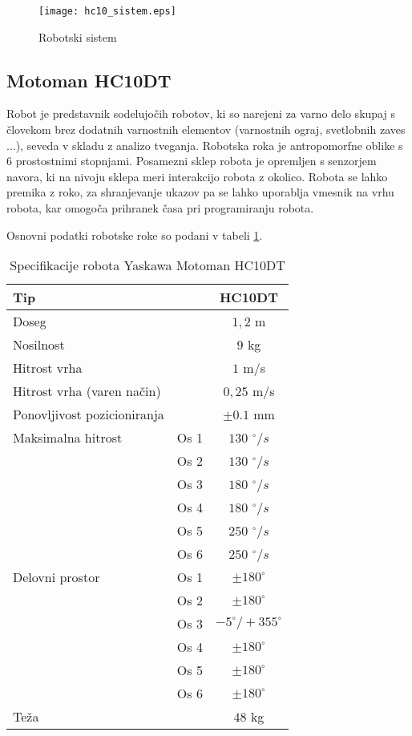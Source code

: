 \begin{figure}[!hbt]
	\centering
	\texttt{[image: hc10\_sistem.eps]}
	\caption{Robotski sistem}
	\label{fig:hc10_sistem}
\end{figure}

\subsection{Motoman HC10DT}

Robot je predstavnik sodelujočih robotov, ki so narejeni za varno delo skupaj s človekom brez dodatnih varnostnih elementov (varnostnih ograj, svetlobnih zaves ...), seveda v skladu z analizo tveganja. Robotska roka je antropomorfne oblike s 6 prostostnimi stopnjami. Posamezni sklep robota je opremljen s senzorjem navora, ki na nivoju sklepa meri interakcijo robota z okolico. Robota se lahko premika z roko, za shranjevanje ukazov pa se lahko uporablja vmesnik na vrhu robota, kar omogoča prihranek časa pri programiranju robota.

Osnovni podatki robotske roke so podani v tabeli \ref{tab:hc10}.

\begin{table}
	\centering
	\caption{Specifikacije robota Yaskawa Motoman HC10DT} \label{tab:hc10}
	\begin{tabular}{|lr|c|}
		\hline   Tip &  & HC10DT \\
		\hline Doseg & & $1,2$ m \\
		\hline Nosilnost  & & $9$ kg \\
		\hline Hitrost vrha& & $1$ m/s \\
		\hline Hitrost vrha (varen način)& & $0,25$ m/s \\
		\hline Ponovljivost pozicioniranja& & $\pm 0.1$ mm \\
		\hline Maksimalna hitrost
		& Os 1 & $130$ $^\circ/s$ \\
		& Os 2 & $130$ $^\circ/s$ \\
		& Os 3 & $180$ $^\circ/s$ \\
		& Os 4 & $180$ $^\circ/s$ \\
		& Os 5 & $250$ $^\circ/s$ \\
		& Os 6 & $250$ $^\circ/s$ \\
		\hline Delovni prostor
		& Os 1 & $\pm180^\circ$\\
		& Os 2 & $\pm180^\circ$\\
		& Os 3 & $-5^\circ/+355^\circ$\\
		& Os 4 & $\pm180^\circ$\\
		& Os 5 & $\pm180^\circ$\\
		& Os 6 & $\pm180^\circ$\\
		\hline   Teža &  & $48$ kg \\
		\hline
	\end{tabular}
\end{table}

